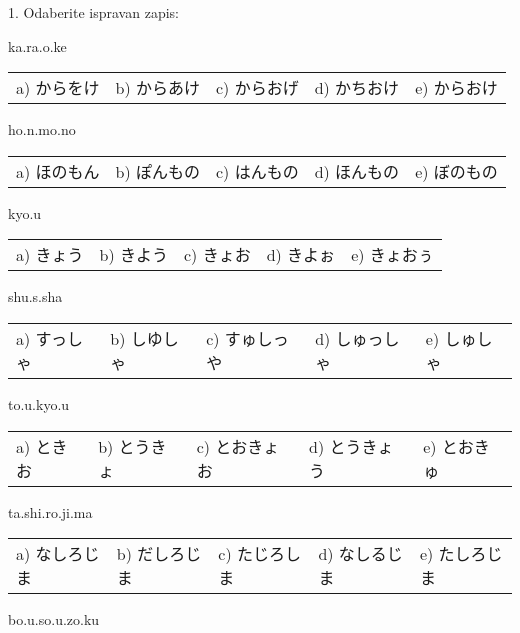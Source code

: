 
\author{Goran Zovak, Tomislav Mamić}

	
	\begin{mondai}{1. Odaberite ispravan zapis:}
		\item ka.ra.o.ke\\ %
		\begin{tabular}{l l l l l}
			a) からをけ & b) からあけ & c) からおげ & d) かちおけ & e) からおけ\\
		\end{tabular}
		\item ho.n.mo.no\\ %
		\begin{tabular}{l l l l l}
			a) ほのもん & b) ぽんもの & c) はんもの & d) ほんもの & e) ぼのもの\\
		\end{tabular}
		\item kyo.u\\ %
		\begin{tabular}{l l l l l}
			a) きょう & b) きよう & c) きょお & d) きよぉ & e) きょおぅ\\
		\end{tabular}
		\item shu.s.sha\\ %
		\begin{tabular}{l l l l l}
			a) すっしゃ & b) しゆしゃ & c) すゅしっや & d) しゅっしゃ & e) しゅしゃ\\
		\end{tabular}
		\item to.u.kyo.u\\ %
		\begin{tabular}{l l l l l}
			a) ときお & b) とうきょ & c) とおきょお & d) とうきょう & e) とおきゅ\\
		\end{tabular}
		\item ta.shi.ro.ji.ma\\ %
		\begin{tabular}{l l l l l}
			a) なしろじま & b) だしろじま & c) たじろしま & d) なしるじま & e) たしろじま\\
		\end{tabular}
		\item bo.u.so.u.zo.ku\\ %

\end{mondai}
